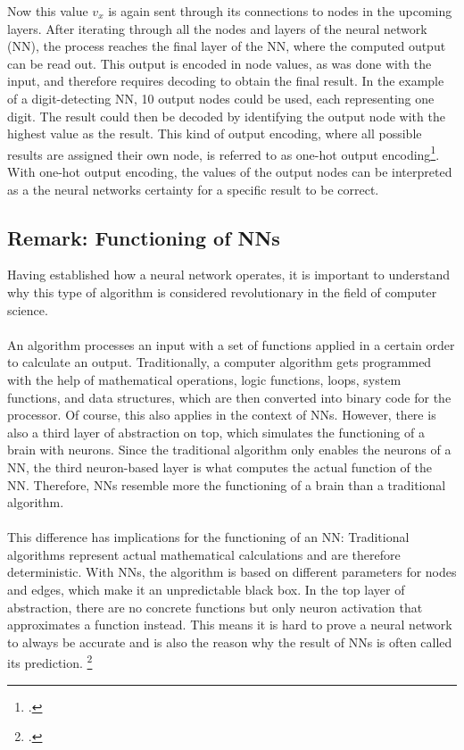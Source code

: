 \documentclass[11pt]{report}
\begin{document}
    Now this value $v_x$ is again sent through its connections to nodes in the upcoming layers.
    After iterating through all the nodes and layers of the neural network (NN), the process reaches the final layer of the NN, where the computed output can be read out.
    This output is encoded in node values, as was done with the input, and therefore requires decoding to obtain the final result.
    In the example of a digit-detecting NN, 10 output nodes could be used, each representing one digit.
    The result could then be decoded by identifying the output node with the highest value as the result.
    This kind of output encoding, where all possible results are assigned their own node, is referred to as one-hot output encoding\footcite{Brownlee2020}.
    With one-hot output encoding, the values of the output nodes can be interpreted as a the neural networks certainty for a specific result to be correct.

    \subsection{Remark: Functioning of NNs}\label{subsec:remark-about-the-funtioning-of-nns}
    Having established how a neural network operates, it is important to understand why this type of algorithm is considered revolutionary in the field of computer science.
    \\ \\
    An algorithm processes an input with a set of functions applied in a certain order to calculate an output.
    Traditionally, a computer algorithm gets programmed with the help of mathematical operations, logic functions, loops, system functions, and data structures, which are then converted into binary code for the processor.
    Of course, this also applies in the context of NNs.
    However, there is also a third layer of abstraction on top, which simulates the functioning of a brain with neurons.
    Since the traditional algorithm only enables the neurons of a NN, the third neuron-based layer is what computes the actual function of the NN. Therefore, NNs resemble more the functioning of a brain than a traditional algorithm.
    \\ \\
    This difference has implications for the functioning of an NN: Traditional algorithms represent actual mathematical calculations and are therefore deterministic.
    With NNs, the algorithm is based on different parameters for nodes and edges, which make it an unpredictable black box.
    In the top layer of abstraction, there are no concrete functions but only neuron activation that approximates a function instead.
    This means it is hard to prove a neural network to always be accurate and is also the reason why the result of NNs is often called its prediction. \footcite{springer_blackbox}%
\end{document}
